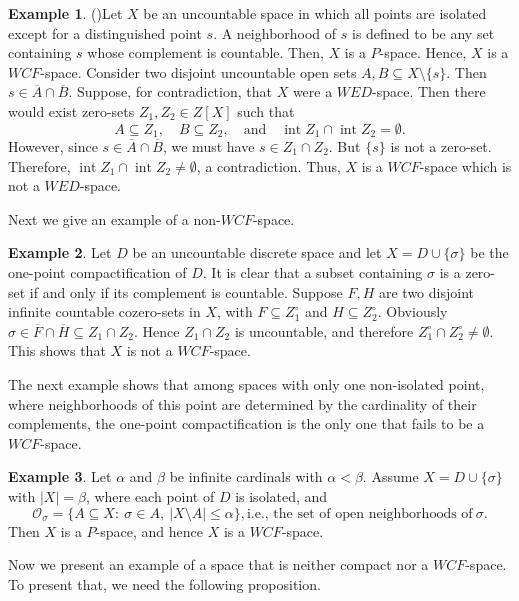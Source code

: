\documentclass{amsart}
\theoremstyle{definition}
\theoremstyle{remark}
\numberwithin{equation}{section}
\newcommand{\CO}{\mathcal{O}}
\newcommand{\al}{\alpha}
\newcommand{\be}{\beta}
\newcommand{\si}{\sigma}
\newcommand{\cc}{\circ}
\newcommand{\ov}{\overline}
\theoremstyle{definition}\newtheorem{thm}{Theorem}[section]
\theoremstyle{definition}\newtheorem{cor}[thm]{Corollary}
\theoremstyle{definition}\newtheorem{lem}[thm]{Lemma}
\theoremstyle{definition}\newtheorem{prop}[thm]{Proposition}
\theoremstyle{definition}\newtheorem{defn}[thm]{Definition}
\theoremstyle{definition}\newtheorem{Rem}[thm]{Remark}
\theoremstyle{remark}\newtheorem{rem}[thm]{Remark}
\theoremstyle{definition}\newtheorem{exam}[thm]{Example}
\theoremstyle{definition}\newtheorem{qu}[thm]{question}
\begin{document}
\begin{exam}(\cite[14.N]{GJ})\label{fati}
Let $X$ be an uncountable space in which all points are isolated except for a distinguished point $s$. A neighborhood of $s$ is defined to be any set containing $s$ whose complement is countable. Then, $X$ is a $P$-space. Hence, $X$ is a $WCF$-space.
    Consider two disjoint uncountable open sets $A, B \subseteq X \setminus \{s\}$. Then
    $s \in \overline{A} \cap \overline{B}$.
    Suppose, for contradiction, that $X$ were a $WED$-space. Then there would exist zero-sets $Z_1, Z_2 \in Z[X]$ such that
    \[
    A \subseteq Z_1, \quad B \subseteq Z_2, \quad \text{and} \quad \operatorname{int} Z_1 \cap \operatorname{int} Z_2 = \emptyset.
    \]
    However, since $s \in \overline{A} \cap \overline{B}$, we must have $s \in Z_1 \cap Z_2$. But $\{s\}$ is not a zero-set.
    Therefore, $\operatorname{int} Z_1 \cap \operatorname{int} Z_2 \neq \emptyset$, a contradiction. Thus, $X$ is a $WCF$-space which is not a $WED$-space.
\end{exam}
Next we give an example of a non-$WCF$-space.

\begin{exam}
Let $D$ be an uncountable discrete space and let $X=D\cup\{\si\}$ be the one-point compactification of $D$.  
It is clear that a subset containing $\si$ is a zero-set if and only if its complement is countable.  
Suppose $F,H$ are two disjoint infinite countable cozero-sets in $X$, with $F\subseteq Z_1^\cc$ and $H\subseteq Z_2^\cc$.  
Obviously $\si\in \ov{F}\cap \ov{H}\subseteq Z_1\cap Z_2$.  
Hence $Z_1\cap Z_2$ is uncountable, and therefore $Z_1^\cc\cap Z_2^\cc\neq\emptyset$.  
This shows that $X$ is not a $WCF$-space.
\end{exam}

The next example shows that among spaces with only one non-isolated point, where neighborhoods of this point are determined by the cardinality of their complements, the one-point compactification is the only one that fails to be a $WCF$-space.

\begin{exam}
Let $\al$ and $\be$ be infinite cardinals with $\al<\be$.  
Assume $X=D\cup\{\si\}$ with $|X|=\be$, where each point of $D$ is isolated, and 
\[
\CO_\si=\{A\subseteq X:~\si\in A,~|X\setminus A|\leq\al\}, \text{i.e., the set of open neighborhoods of}~\sigma.\]
Then $X$ is a $P$-space, and hence $X$ is a $WCF$-space.
\end{exam}
Now we present an example of a space that is neither compact nor a $WCF$-space. 
To present that, we need the following proposition.
\end{document}
